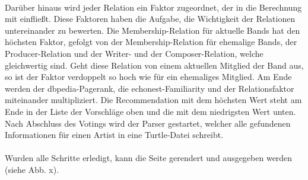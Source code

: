 \paragraph{} Darüber hinaus wird jeder Relation ein Faktor zugeordnet, der in die Berechnung mit einfließt. Diese Faktoren haben die Aufgabe, die Wichtigkeit der Relationen untereinander zu bewerten. Die Membership-Relation für aktuelle Bands hat den höchsten Faktor, gefolgt von der Membership-Relation für ehemalige Bands, der Producer-Relation und der Writer- und der Composer-Relation, welche gleichwertig sind. Geht diese Relation von einem aktuellen Mitglied der Band aus, so ist der Faktor verdoppelt so hoch wie für ein ehemaliges Mitglied. Am Ende werden der dbpedia-Pagerank, die echonest-Familiarity und der Relationsfaktor miteinander multipliziert. Die Recommendation mit dem höchsten Wert steht am Ende in der Liste der Vorschläge oben und die mit dem niedrigsten Wert unten.
Nach Abschluss des Votings wird der Parser gestartet, welcher alle gefundenen Informationen für einen Artist in eine Turtle-Datei schreibt.

\paragraph{} Wurden alle Schritte erledigt, kann die Seite gerendert und ausgegeben werden (siehe Abb. x).


